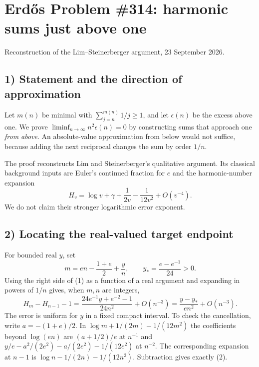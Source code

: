 \section{Erd\H{o}s Problem \#314: harmonic sums just above one}
\noindent Reconstruction of the Lim--Steinerberger argument, 23 September 2026.

\subsection*{1) Statement and the direction of approximation}
Let $m(n)$ be minimal with $\sum_{j=n}^{m(n)}1/j\ge1$, and let $\epsilon(n)$ be the excess above one. We prove $\liminf_{n\to\infty}n^2\epsilon(n)=0$ by constructing sums that approach one \emph{from above}. An absolute-value approximation from below would not suffice, because adding the next reciprocal changes the sum by order $1/n$.

The proof reconstructs Lim and Steinerberger's qualitative argument. Its classical background inputs are Euler's continued fraction for $e$ and the harmonic-number expansion
\[
 H_v=\log v+\gamma+\frac1{2v}-\frac1{12v^2}+O(v^{-4}).\tag{1}
\]
We do not claim their stronger logarithmic error exponent.

\subsection*{2) Locating the real-valued target endpoint}
For bounded real $y$, set
\[
 m=en-\frac{1+e}{2}+\frac yn,
 \qquad y_* =\frac{e-e^{-1}}{24}>0.
\]
Using the right side of (1) as a function of a real argument and expanding in powers of $1/n$ gives, when $m,n$ are integers,
\[
 H_m-H_{n-1}-1
 =\frac{24e^{-1}y+e^{-2}-1}{24n^2}+O(n^{-3})
 =\frac{y-y_*}{en^2}+O(n^{-3}).\tag{2}
\]
The error is uniform for $y$ in a fixed compact interval. To check the cancellation, write $a=-(1+e)/2$. In $\log m+1/(2m)-1/(12m^2)$ the coefficients beyond $\log(en)$ are $(a+1/2)/e$ at $n^{-1}$ and $y/e-a^2/(2e^2)-a/(2e^2)-1/(12e^2)$ at $n^{-2}$. The corresponding expansion at $n-1$ is $\log n-1/(2n)-1/(12n^2)$. Subtraction gives exactly (2).

